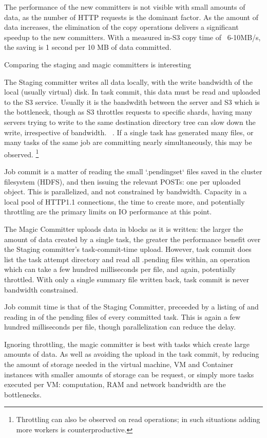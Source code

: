 \documentclass[conference]{IEEEtran}
\begin{document}
The performance of the new committers is not visible with small amounts
of data, as the number of HTTP requests is the dominant factor.
As the amount of data increases, the elimination of the copy operations
delivers a significant speedup to the new committers.
With a measured in-S3 copy time of ~6-10MB/s, the saving is 1 second per 10 MB
of data committed.

Comparing the staging and magic committers is interesting

The Staging committer writes all data locally, with the write bandwidth
of the local (usually virtual) disk.
In task commit, this data must be read and uploaded to the S3 service.
Usually it is the bandwdith between the server and S3 which is the bottleneck,
though as S3 throttles requests to specific shards, having many servers trying
to write to the same destination directory tree can slow down the write, irrespective
of bandwidth.
\ \cite{AWS-S3-throttling}.
If a single task has generated many files, or many tasks of the same job are
committing nearly simultaneously, this may be observed.
\footnote{Throttling can also be observed on read operations;
in such situations adding more workers is counterproductive.}

Job commit is a matter of reading the small `.pendingset` files saved in the
cluster filesystem (HDFS), and then issuing the relevant POSTs: one per uploaded
object.
This is parallelized, and not constrained by bandwidth.
Capacity in a local pool of HTTP1.1 connections, the time to create more,
and potentially throttling are the primary limits on IO performance at this point.

The Magic Committer uploads data in blocks as it is written: the larger
the amount of data created by a single task, the greater the performance
benefit over the Staging committer's task-commit-time upload.
However, task commit does list the task attempt directory and read all .pending
files within, an operation which can take a few hundred milliseconds per file,
and again, potentially throttled.
With only a single summary file written back, task commit is never
bandwidth constrained.

Job commit time is that of the Staging Committer, preceeded by a listing
of and reading in of the pending files of every committed task.
This is again a few hundred milliseconds per file, though parallelization
can reduce the delay.

Ignoring throttling, the magic committer is best with tasks which create
large amounts of data.
As well as avoiding the upload in the task commit, by reducing the
amount of storage needed in the virtual machine, VM and Container instances
with smaller amounts of storage can be request, or simply more tasks executed
per VM: computation, RAM and network bandwidth are the bottlenecks.
\end{document}

